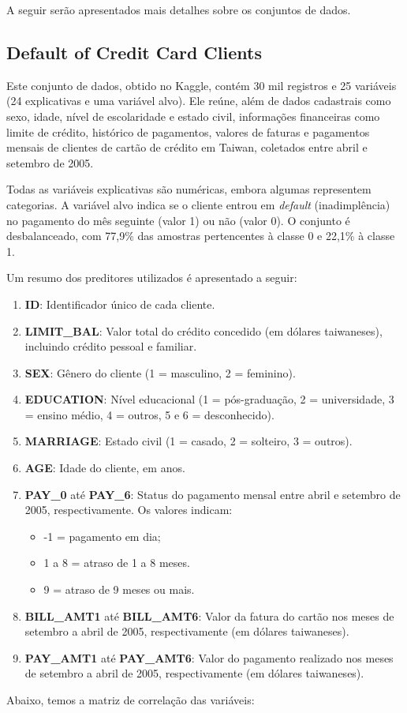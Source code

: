 A seguir serão apresentados mais detalhes sobre os conjuntos de dados.

\subsection{Default of Credit Card Clients}

Este conjunto de dados, obtido no Kaggle, contém 30 mil registros e 25 variáveis (24 explicativas e uma variável alvo). Ele reúne, além de dados cadastrais como sexo, idade, nível de escolaridade e estado civil, informações financeiras como limite de crédito, histórico de pagamentos, valores de faturas e pagamentos mensais de clientes de cartão de crédito em Taiwan, coletados entre abril e setembro de 2005.

Todas as variáveis explicativas são numéricas, embora algumas representem categorias. A variável alvo indica se o cliente entrou em \textit{default} (inadimplência) no pagamento do mês seguinte (valor 1) ou não (valor 0). O conjunto é desbalanceado, com 77,9\% das amostras pertencentes à classe 0 e 22,1\% à classe 1.

Um resumo dos preditores utilizados é apresentado a seguir:

\begin{enumerate}
    \item \textbf{ID}: Identificador único de cada cliente.
    \item \textbf{LIMIT\_BAL}: Valor total do crédito concedido (em dólares taiwaneses), incluindo crédito pessoal e familiar.
    \item \textbf{SEX}: Gênero do cliente (1 = masculino, 2 = feminino).
    \item \textbf{EDUCATION}: Nível educacional (1 = pós-graduação, 2 = universidade, 3 = ensino médio, 4 = outros, 5 e 6 = desconhecido).
    \item \textbf{MARRIAGE}: Estado civil (1 = casado, 2 = solteiro, 3 = outros).
    \item \textbf{AGE}: Idade do cliente, em anos.
    \item \textbf{PAY\_0} até \textbf{PAY\_6}: Status do pagamento mensal entre abril e setembro de 2005, respectivamente. Os valores indicam:
    \begin{itemize}
        \item -1 = pagamento em dia;
        \item 1 a 8 = atraso de 1 a 8 meses.
        \item 9 = atraso de 9 meses ou mais.
    \end{itemize}
    \item \textbf{BILL\_AMT1} até \textbf{BILL\_AMT6}: Valor da fatura do cartão nos meses de setembro a abril de 2005, respectivamente (em dólares taiwaneses).
    \item \textbf{PAY\_AMT1} até \textbf{PAY\_AMT6}: Valor do pagamento realizado nos meses de setembro a abril de 2005, respectivamente (em dólares taiwaneses).
\end{enumerate}
Abaixo, temos a matriz de correlação das variáveis:

